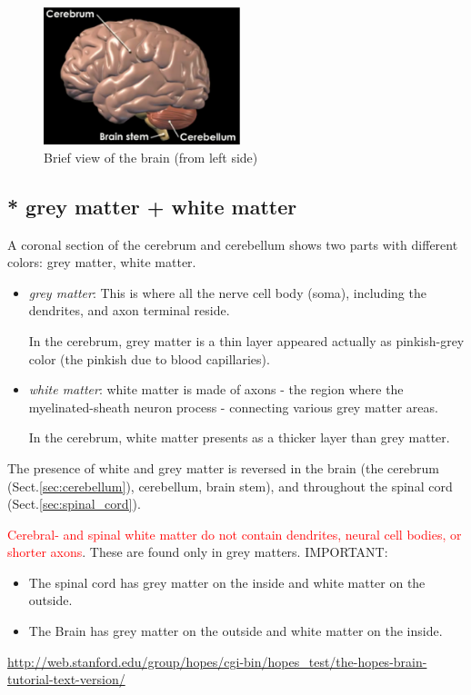 \begin{figure}[hbt]
  \centerline{\includegraphics[height=4cm,
    angle=0]{./images/brain_01.eps}}
\caption{Brief view of the brain (from left side)}
\label{fig:brain_structure}
\end{figure}

\subsection{* grey matter + white matter}
\label{sec:anatomy-colors}

A coronal section of the cerebrum and cerebellum shows two parts
with different colors:  grey matter, white matter.
\begin{itemize}

  \item {\it grey matter}: This is where all the nerve cell body (soma),
  including the dendrites, and axon terminal reside.
  
  In the cerebrum, grey matter is a thin layer appeared actually as pinkish-grey
  color (the pinkish due to blood capillaries).
  
 
  \item {\it white matter}:  white matter is made of axons - the region where the
  myelinated-sheath neuron process - connecting various grey matter areas.
  
  In the cerebrum, white matter presents as a thicker layer than grey matter.
  
\end{itemize}

The presence of white and grey matter is reversed in the brain (the cerebrum
(Sect.\ref{sec:cerebellum}), cerebellum, brain stem), and throughout the spinal
cord (Sect.\ref{sec:spinal_cord}).
 
\textcolor{red}{Cerebral- and spinal white matter do not contain dendrites,
neural cell bodies, or shorter axons}. These are found only in grey matters.
IMPORTANT: 
\begin{itemize}
  \item  The spinal cord has grey matter on the inside and white matter on the
outside.

  \item The Brain has grey matter on the outside and white matter on the inside.

\end{itemize}
\url{http://web.stanford.edu/group/hopes/cgi-bin/hopes_test/the-hopes-brain-tutorial-text-version/}


